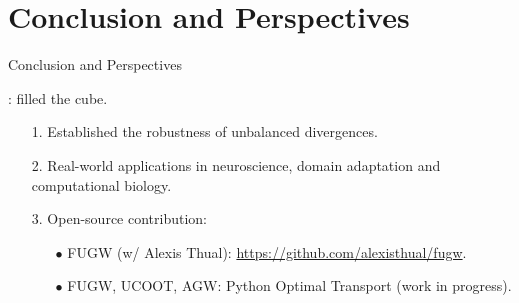 \documentclass{beamer}
\begin{document}
\section{Conclusion and Perspectives}
\begin{frame}{Conclusion and Perspectives}
\scriptsize

{}: filled the cube.
\begin{enumerate}
  \item[1.] Established the robustness of unbalanced divergences.
  \item[2.] Real-world applications in neuroscience, domain adaptation and computational biology.
  \item[3.] Open-source contribution:
  \begin{itemize}
    \setlength\itemindent{5pt}
    \scriptsize
    \item[$\bullet$] FUGW (w/ Alexis Thual): \url{https://github.com/alexisthual/fugw}.
    \item[$\bullet$] FUGW, UCOOT, AGW: Python Optimal Transport (work in progress).
  \end{itemize}
\end{enumerate}


\end{frame}
\end{document}

